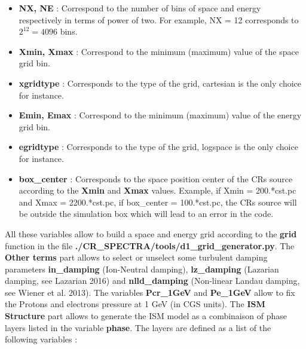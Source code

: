         \begin{itemize}
            \item {\bf{NX, NE}} : Correspond to the number of bins of space and energy respectively in terms of power of two. For example, NX = 12 corresponds to 
                                $2^{12} = 4096$ bins. 
            \item {\bf{Xmin, Xmax}} : Correspond to the minimum (maximum) value of the space grid bin. 
            \item {\bf{xgridtype}} : Corresponds to the type of the grid, cartesian is the only choice for instance. 
            \item {\bf{Emin, Emax}} : Correspond to the minimum (maximum) value of the energy grid bin. 
            \item {\bf{egridtype}} : Corresponds to the type of the grid, logspace is the only choice for instance.  
            \item {\bf{box\_center}} : Corresponds to the space position center of the CRs source according to the {\bf{Xmin}} and {\bf{Xmax}} values. Example, if 
                                    Xmin = 200.*cst.pc and Xmax = 2200.*cst.pc, if box\_center = 100.*cst.pc, the CRs source will be outside the simulation box which will
                                    lead to an error in the code.  
        \end{itemize}

        \noi All these variables allow to build a space and energy grid according to the {\bf{grid}} function in the file {\bf{./CR\_SPECTRA/tools/d1\_grid\_generator.py}}.
        The {\bf{Other terms}} part allows to select or unselect some turbulent damping parameters {\bf{in\_damping}} (Ion-Neutral damping), {\bf{lz\_damping}} (Lazarian 
        damping, see Lazarian 2016) and {\bf{nlld\_damping}} (Non-linear Landau damping, see Wiener et al. 2013). The variables {\bf{Pcr\_1GeV}} and {\bf{Pe\_1GeV}}
        allow to fix the Protons and electrons pressure at 1 GeV (in CGS units). The {\bf{ISM Structure}} part allows to generate the ISM model as a combinaison of 
        phase layers listed in the variable {\bf{phase}}. The layers are defined as a list of the following variables : 

